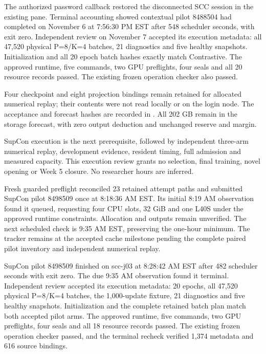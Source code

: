 
The authorized password callback restored the disconnected SCC session in the
existing pane. Terminal accounting showed contextual pilot 8488504 had completed
on November 6 at 7:56:30 PM EST after 548 scheduler seconds, with exit zero.
Independent review on November 7 accepted its execution metadata: all 47,520
physical P=8/K=4 batches, 21 diagnostics and five healthy snapshots. Initialization
and all 20 epoch batch hashes exactly match Contrastive. The approved runtime,
five commands, two GPU preflights, four seals and all 20 resource records passed.
The existing frozen operation checker also passed.

Four checkpoint and eight projection bindings remain retained for allocated
numerical replay; their contents were not read locally or on the login node.
The acceptance and forecast hashes are recorded in
. All 202 GB remain in the storage
forecast, with zero output deduction and unchanged reserve and margin.

SupCon execution is the next prerequisite, followed by independent three-arm
numerical replay, development evidence, resident timing, full admission and
measured capacity. This execution review grants no selection, final training,
novel opening or Week 5 closure. No researcher hours are inferred.

Fresh guarded preflight reconciled 23 retained attempt paths and submitted
SupCon pilot 8498509 once at 8:18:36 AM EST. Its initial 8:19 AM observation
found it queued, requesting four CPU slots, 32 GiB and one L40S under the
approved runtime constraints. Allocation and outputs remain unverified.
The next scheduled check is 9:35 AM EST, preserving the one-hour minimum.
The tracker remains at the accepted cache milestone pending the complete
paired pilot inventory and independent numerical replay.


SupCon pilot 8498509 finished on scc-j03 at 8:28:42 AM EST after 482 scheduler
seconds with exit zero. The due 9:35 AM observation found it terminal.
Independent review accepted its execution metadata: 20 epochs, all 47,520
physical P=8/K=4 batches, the 1,000-update fixture, 21 diagnostics and five
healthy snapshots. Initialization and the complete retained batch plan match
both accepted pilot arms. The approved runtime, five commands, two GPU
preflights, four seals and all 18 resource records passed. The existing frozen
operation checker passed, and the terminal recheck verified 1,374 metadata
and 616 source bindings.

